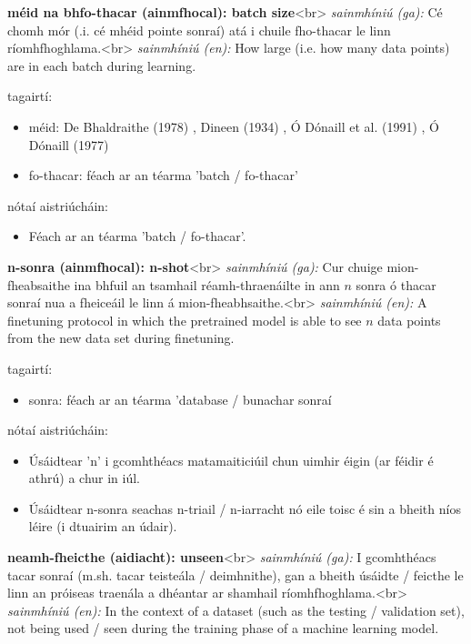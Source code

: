 \documentclass{article}
\begin{document}
\textbf{méid na bhfo-thacar (ainmfhocal): batch size}<br>
\textit{sainmhíniú (ga):} Cé chomh mór (.i. cé mhéid pointe sonraí) atá i chuile fho-thacar le linn ríomhfhoghlama.<br>
\textit{sainmhíniú (en):} How large (i.e. how many data points) are in each batch during learning.

tagairtí:
\begin{itemize}
	\item méid: De Bhaldraithe (1978) \cite{de-bhaldraithe}, Dineen (1934) \cite{dineen}, Ó Dónaill et al. (1991) \cite{focloir-beag}, Ó Dónaill (1977) \cite{odonaill}
	\item fo-thacar: féach ar an téarma 'batch / fo-thacar'
\end{itemize}

nótaí aistriúcháin:
\begin{itemize}
	\item Féach ar an téarma 'batch / fo-thacar'.
\end{itemize}


\textbf{n-sonra (ainmfhocal): n-shot}<br>
\textit{sainmhíniú (ga):} Cur chuige mion-fheabsaithe ina bhfuil an tsamhail réamh-thraenáilte in ann $n$ sonra ó thacar sonraí nua a fheiceáil le linn á mion-fheabhsaithe.<br>
\textit{sainmhíniú (en):} A finetuning protocol in which the pretrained model is able to see $n$ data points from the new data set during finetuning.

tagairtí:
\begin{itemize}
	\item sonra: féach ar an téarma 'database / bunachar sonraí
\end{itemize}

nótaí aistriúcháin:
\begin{itemize}
	\item Úsáidtear 'n' i gcomhthéacs matamaiticiúil chun uimhir éigin (ar féidir é athrú) a chur in iúl.
	\item Úsáidtear n-sonra seachas n-triail / n-iarracht nó eile toisc é sin a bheith níos léire (i dtuairim an údair).
\end{itemize}


\textbf{neamh-fheicthe (aidiacht): unseen}<br>
\textit{sainmhíniú (ga):} I gcomhthéacs tacar sonraí (m.sh. tacar teisteála / deimhnithe), gan a bheith úsáidte / feicthe le linn an próiseas traenála a dhéantar ar shamhail ríomhfhoghlama.<br>
\textit{sainmhíniú (en):} In the context of a dataset (such as the testing / validation set), not being used / seen during the training phase of a machine learning model.
\end{document}
